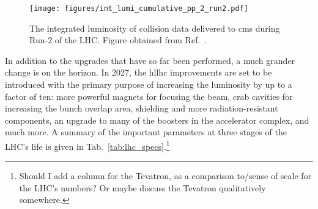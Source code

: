 \begin{figure}[htbp]
    \centering
    \texttt{[image: figures/int\_lumi\_cumulative\_pp\_2\_run2.pdf]}
    \caption[The integrated luminosity of \pp collision data delivered to CMS during Run-2 of the LHC]{The integrated luminosity of \pp collision data delivered to \acrshort{cms} during Run-2 of the LHC. Figure obtained from Ref.~.}
    \label{fig:detector_cms_lumi}
\end{figure}

In addition to the upgrades that have so far been performed, a much grander change is on the horizon. In 2027, the \acrfull{hllhc} improvements are set to be introduced with the primary purpose of increasing the luminosity by up to a factor of ten: more powerful magnets for focusing the beam, crab cavities for increasing the bunch overlap area, shielding and more radiation-resistant components, an upgrade to many of the boosters in the accelerator complex, and much more. A summary of the important parameters at three stages of the LHC's life is given in Tab.~\ref{tab:lhc_specs}.\footnote{Should I add a column for the Tevatron, as a comparison to/sense of scale for the LHC's numbers? Or maybe discuss the Tevatron qualitatively somewhere.}

